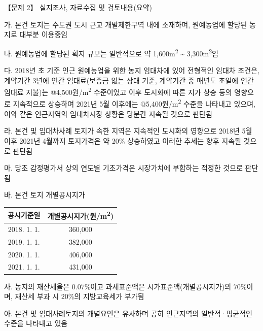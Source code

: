 \begin{longquestion}{【문제 2】}
\medskip{} 실지조사, 자료수집 및 검토내용(요약) \par
\medskip\noindent \hspace*{1em}가. 본건 토지는 수도권 도시 근교 개발제한구역 내에 소재하며, 원예농업에 할당된 농지로 대부분 이용중임 \par
\hspace*{1em}나. 원예농업에 할당된 획지 규모는 일반적으로 약 1,600m\textsuperscript{2} \textasciitilde{} 3,300m\textsuperscript{2}임 \par
\hspace*{1em}다. 2018년 초 기준 인근 원예농업을 위한 농지 임대차에 있어 전형적인 임대차 조건은, 계약기간 3년에 연간 임대료(보증금 없는 상태 기준, 계약기간 중 매년도 초일에 연간임대료 지불)는 @4,500원/m\textsuperscript{2} 수준이었고 이후 도시화에 따른 지가 상승 등의 영향으로 지속적으로 상승하여 2021년 5월 이후에는 @5,400원/m\textsuperscript{2} 수준을 나타내고 있으며, 이와 같은 인근지역의 임대차시장 상황은 당분간 지속될 것으로 판단됨 \par
\hspace*{1em}라. 본건 및 임대차사례 토지가 속한 지역은 지속적인 도시화의 영향으로 2018년 5월 이후 2021년 4월까지 토지가격은 약 20\% 상승하였고 이러한 추세는 향후 지속될 것으로 판단됨 \par
\hspace*{1em}마. 당초 감정평가서 상의 연도별 기초가격은 시장가치에 부합하는 적정한 것으로 판단됨 \par
\hspace*{1em}바. 본건 토지 개별공시지가 \par
{\small\centering
\begin{tabular}{|c|c|}\hline
공시기준일 & 개별공시지가(원/m\textsuperscript{2}) \\\hline
2018. 1. 1. & 360,000 \\\hline
2019. 1. 1. & 382,000 \\\hline
2020. 1. 1. & 406,000 \\\hline
2021. 1. 1. & 431,000 \\\hline
\end{tabular}\par}
\hspace*{1em}사. 농지의 재산세율은 0.07\%이고 과세표준액은 시가표준액(개별공시지가)의 70\%이며, 재산세 부과 시 20\%의 지방교육세가 부가됨 \par
\hspace*{1em}아. 본건 및 임대사례토지의 개별요인은 유사하며 공히 인근지역의 일반적·평균적인 수준을 나타내고 있음 \par
\end{longquestion}
